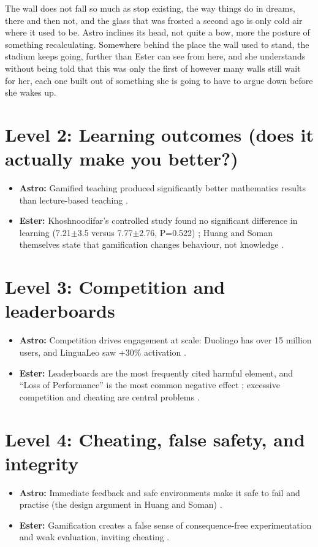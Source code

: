 \documentclass{article}
\begin{document}
The wall does not fall so much as stop existing, the way things do in dreams, there and then not, and the glass that was frosted a second ago is only cold air where it used to be. Astro inclines its head, not quite a bow, more the posture of something recalculating. Somewhere behind the place the wall used to stand, the stadium keeps going, further than Ester can see from here, and she understands without being told that this was only the first of however many walls still wait for her, each one built out of something she is going to have to argue down before she wakes up.

\section{Level 2: Learning outcomes (does it actually make you better?)}
\begin{itemize}
  \item \textbf{Astro:} Gamified teaching produced significantly better mathematics results than lecture-based teaching \cite{gomez2017}.
  \item \textbf{Ester:} Khoshnoodifar's controlled study found no significant difference in learning (7.21$\pm$3.5 versus 7.77$\pm$2.76, P=0.522) \cite{khoshnoodifar2023}; Huang and Soman themselves state that gamification changes behaviour, not knowledge \cite{huang2013}.
\end{itemize}

\section{Level 3: Competition and leaderboards}
\begin{itemize}
  \item \textbf{Astro:} Competition drives engagement at scale: Duolingo has over 15 million users, and LinguaLeo saw +30\% activation \cite{biryukov2021}.
  \item \textbf{Ester:} Leaderboards are the most frequently cited harmful element, and ``Loss of Performance'' is the most common negative effect \cite{toda2018}; excessive competition and cheating are central problems \cite{harviainen2014}.
\end{itemize}

\section{Level 4: Cheating, false safety, and integrity}
\begin{itemize}
  \item \textbf{Astro:} Immediate feedback and safe environments make it safe to fail and practise (the design argument in Huang and Soman) \cite{huang2013}.
  \item \textbf{Ester:} Gamification creates a false sense of consequence-free experimentation and weak evaluation, inviting cheating \cite{harviainen2014, mirzaiefeizabadi2022}.
\end{itemize}
\end{document}
